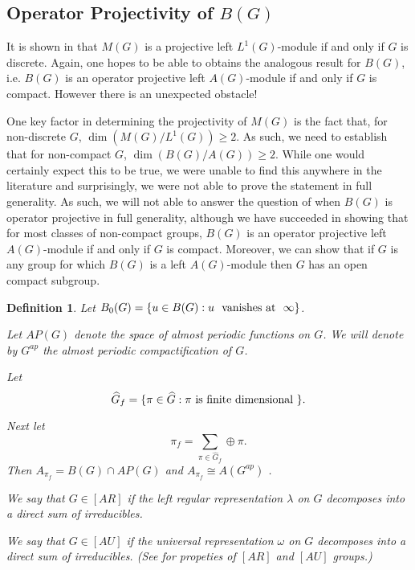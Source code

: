 \documentclass[10pt]{amsart}
\newtheorem{defn}[thm]{Definition}
\numberwithin{thm}{section}
\numberwithin{equation}{section}
\begin{document}
\subsection{Operator Projectivity of $B(G)$}

It is shown in \cite[Theorem 2.6]{DP04} that $M(G)$ is a projective left $L^1(G)$-module
if and only if $G$ is discrete. Again, one hopes to be able to obtains the analogous result
for $B(G)$, i.e. $B(G)$ is an operator projective left $A(G)$-module if and only if
$G$ is compact. However there is an unexpected obstacle!

One key factor in determining the projectivity of $M(G)$ is the fact that, for non-discrete $G$, 
$\dim(M(G)/L^1(G))\geq 2$. As such, we need to establish that for non-compact $G$, $\dim(B(G)/A(G))\geq 2$. While 
one would certainly expect this to be true, we were unable to find this anywhere in the literature and 
surprisingly, we were not able to prove the statement in full generality. As such, we will not able to answer 
the question of when $B(G)$ is operator projective in full generality, although we have succeeded in showing 
that for most classes of non-compact groups, $B(G)$ is an operator projective left $A(G)$-module if and only if
$G$ is compact. Moreover, we can show that if $G$ is any group for which $B(G)$ is a left $A(G)$-module
then $G$ has an open compact subgroup.  

\begin{defn}

Let $B_0(G)=\{u\in B(G) : u \textnormal{~ vanishes at ~} \infty\}$. 

Let $AP(G)$ denote the space of almost periodic functions on $G$. We will 
denote by $G^{ap}$ the almost periodic compactification of $G$. 

Let \[\widehat {G}_f=\{\pi \in \widehat {G} : \pi  \textnormal{~is finite dimensional~}\}.\]  

Next let  
\[\pi_f=\sum\limits_{\pi \in \widehat {G}_f} \oplus \pi .\]
 Then $A_{\pi _f}=B(G)\cap AP(G)$ and 
$A_{\pi _f}\cong A(G^{ap})$ \cite{BelFor}. 

We say that $G\in[AR]$ if the left regular representation $ \lambda $ on $G$ decomposes 
into a direct sum of irreducibles. 

We say that $G\in[AU]$ if the universal representation $\omega $ on $G$ decomposes 
into a direct sum of irreducibles. (See \cite{Taylor} for propeties of $[AR]$ and $[AU]$ groups.)
\end{defn}
\end{document}
